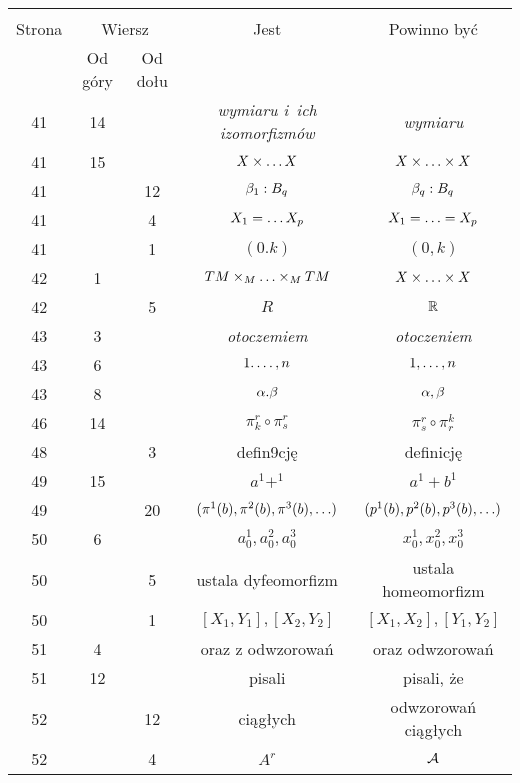 \documentclass[a4paper,11pt]{article}
\begin{document}
\begin{center}
  \begin{tabular}{|c|c|c|c|c|}
    \hline
    & \multicolumn{2}{c|}{} & & \\
    Strona & \multicolumn{2}{c|}{Wiersz} & Jest
                              & Powinno być \\ \cline{2-3}
    & Od góry & Od dołu & & \\
    \hline
    41  & 14 & & \emph{wymiaru i~ich izomorfizmów} & \emph{wymiaru} \\
    41  & 15 & & $X \times \ldots X$ & $X \times \ldots \times X$ \\
    41  & & 12 & $\beta_{ 1 } : B_{ q }$ & $\beta_{ q } : B_{ q }$ \\
    41  & &  4 & $X_{ 1 } = \ldots X_{ p }$ & $X_{ 1 } = \ldots = X_{ p }$ \\
    41  & &  1 & $( 0. k )$ & $( 0, k )$ \\
    42  &  1 & & $TM \times_{ M } \ldots \times_{ M } TM$ & $X \times \ldots \times X$ \\
    42  & &  5 & $R$ & $\mathbb{R}$ \\
    43  &  3 & & \emph{otoczemiem} & \emph{otoczeniem} \\
    43  &  6 & & $1 . \ldots, n$ & $1, \ldots, n$ \\
    43  &  8 & & $\alpha. \beta$ & $\alpha, \beta$ \\
    46  & 14 & & $\pi_{ k }^{ r } \circ \pi^{ r }_{ s }$
           & $\pi_{ s }^{ r } \circ \pi^{ k }_{ r }$ \\
    48  & &  3 & defin9cję & definicję \\
    49  & 15 & & $a^{ 1 } + ^{ 1 }$ & $a^{ 1 } + b^{ 1 }$ \\
    49  & & 20 & $( \pi^{ 1 } ( b ), \pi^{ 2 } ( b ), \pi^{ 3 } ( b ), \ldots )$
           & $( p^{ 1 } ( b ), p^{ 2 } ( b ), p^{ 3 } ( b ), \ldots )$ \\
    50  &  6 & & $a_{ 0 }^{ 1 }, a_{ 0 }^{ 2 }, a_{ 0 }^{ 3 }$
           & $x_{ 0 }^{ 1 }, x_{ 0 }^{ 2 }, x_{ 0 }^{ 3 }$ \\
    50  & &  5 & ustala dyfeomorfizm & ustala homeomorfizm \\
    50  & & 1 & $[ X_{ 1 }, Y_{ 1 }], [ X_{ 2 }, Y_{ 2 } ]$
           & $[ X_{ 1 }, X_{ 2 }], [ Y_{ 1 }, Y_{ 2 } ]$ \\
    51  &  4 & & oraz z odwzorowań & oraz odwzorowań \\
    51  & 12 & & pisali & pisali, że \\
    52  & & 12 & ciągłych & odwzorowań ciągłych \\
    52  & &  4 & $A^{ r }$ & $\mathcal{A}$ \\

\end{tabular}
\end{center}
\end{document}
